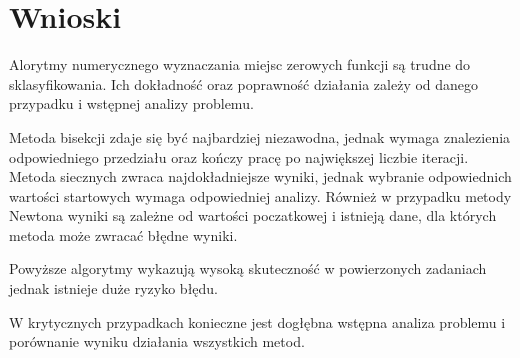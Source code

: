 \documentclass{article}
\begin{document}
\section{Wnioski}

Alorytmy numerycznego wyznaczania miejsc zerowych funkcji są trudne do sklasyfikowania.
Ich dokładność oraz poprawność działania zależy od danego przypadku i wstępnej analizy problemu.

Metoda bisekcji zdaje się być najbardziej niezawodna, jednak wymaga znalezienia odpowiedniego przedziału oraz kończy pracę po największej liczbie iteracji.
Metoda siecznych zwraca najdokładniejsze wyniki, jednak wybranie odpowiednich wartości startowych wymaga odpowiedniej analizy.
Również w przypadku metody Newtona wyniki są zależne od wartości poczatkowej i istnieją dane, dla których metoda może zwracać błędne wyniki.

Powyższe algorytmy wykazują wysoką skuteczność w powierzonych zadaniach jednak istnieje duże ryzyko błędu.

W krytycznych przypadkach konieczne jest dogłębna wstępna analiza problemu i porównanie wyniku działania wszystkich metod.
\end{document}
